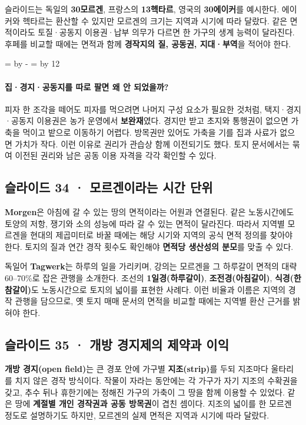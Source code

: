 \documentclass[10pt,a4paper]{article}
\newcommand{\ReserveQuestionSpace}{%
  \par\begingroup
  \dimen0=\pagegoal \advance\dimen0 by -\pagetotal
  \dimen2=\baselineskip \multiply\dimen2 by 12
  \ifdim\dimen0<\dimen2 \newpage\fi
  \endgroup}
\begin{document}
슬라이드는 독일의 \textbf{30모르겐}, 프랑스의 \textbf{13헥타르}, 영국의 \textbf{30에이커}를 예시한다. 에이커와 헥타르는 환산할 수 있지만 모르겐의 크기는 지역과 시기에 따라 달랐다. 같은 면적이라도 토질·공동지 이용권·납부 의무가 다르면 한 가구의 생계 능력이 달라진다. 후페를 비교할 때에는 면적과 함께 \textbf{경작지의 질, 공동권, 지대·부역}을 적어야 한다.\par

\ReserveQuestionSpace
\paragraph{집·경지·공동지를 따로 팔면 왜 안 되었을까?}

피자 한 조각을 떼어도 피자를 먹으려면 나머지 구성 요소가 필요한 것처럼, 택지·경지·공동지 이용권은 농가 운영에서 \textbf{보완재}였다. 경지만 받고 초지와 통행권이 없으면 가축을 먹이고 밭으로 이동하기 어렵다. 방목권만 있어도 가축을 기를 집과 사료가 없으면 가치가 작다. 이런 이유로 권리가 관습상 함께 이전되기도 했다. 토지 문서에서는 묶여 이전된 권리와 남은 공동 이용 자격을 각각 확인할 수 있다.\par

\subsection{슬라이드 34 · 모르겐이라는 시간 단위}
\textbf{Morgen}은 아침에 갈 수 있는 땅의 면적이라는 어원과 연결된다. 같은 노동시간에도 토양의 저항, 쟁기와 소의 성능에 따라 갈 수 있는 면적이 달라진다. 따라서 지역별 모르겐을 현대의 제곱미터로 바꿀 때에는 해당 시기와 지역의 공식 면적 정의를 찾아야 한다. 토지의 질과 연간 경작 횟수도 확인해야 \textbf{면적당 생산성의 분모}를 맞출 수 있다.\par

독일어 \textbf{Tagwerk}는 하루의 일을 가리키며, 강의는 모르겐을 그 하루갈이 면적의 대략 60–70\%로 잡은 관행을 소개한다. 조선의 \textbf{1일경(하루갈이)}, \textbf{조전경(아침갈이)}, \textbf{식경(한참갈이)}도 노동시간으로 토지의 넓이를 표현한 사례다. 이런 비율과 이름은 지역의 경작 관행을 담으므로, 옛 토지 매매 문서의 면적을 비교할 때에는 지역별 환산 근거를 밝혀야 한다.\par

\subsection{슬라이드 35 · 개방 경지제의 제약과 이익}
\textbf{개방 경지(open field)}는 큰 경포 안에 가구별 \textbf{지조(strip)}를 두되 지조마다 울타리를 치지 않은 경작 방식이다. 작물이 자라는 동안에는 각 가구가 자기 지조의 수확권을 갖고, 추수 뒤나 휴한기에는 정해진 가구의 가축이 그 땅을 함께 이용할 수 있었다. 같은 땅에 \textbf{계절별 개인 경작권과 공동 방목권}이 겹친 셈이다. 지조의 넓이를 한 모르겐 정도로 설명하기도 하지만, 모르겐의 실제 면적은 지역과 시기에 따라 달랐다.\par
\end{document}
